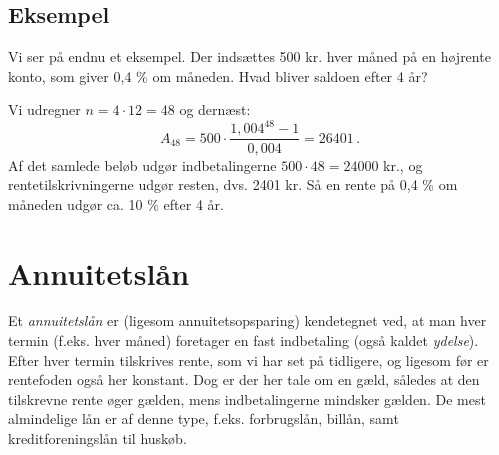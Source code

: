 \documentclass[12pt,oneside,a4paper]{article}
\begin{document}
\begin{tcolorbox}
\subsection*{Eksempel}
Vi ser på endnu et eksempel. Der indsættes 500 kr. hver måned på en højrente konto, som giver
0,4 $\%$ om måneden. Hvad bliver saldoen efter 4 år?

Vi udregner $n=4\cdot12 = 48$ og dernæst:
\[
A_{48} = 500\cdot\frac{1,004^{48}-1}{0,004} = 26401 \,.
\]
Af det samlede beløb udgør indbetalingerne $500\cdot 48 = 24000$ kr., og rentetilskrivningerne
udgør resten, dvs. 2401 kr. Så en rente på 0,4 $\%$ om måneden udgør ca. 10 $\%$ efter 4 år.

\end{tcolorbox}

\section{Annuitetslån}
Et \emph{annuitetslån} er (ligesom annuitetsopsparing) kendetegnet ved, at man
hver termin (f.eks. hver måned) foretager en fast indbetaling (også kaldet
\emph{ydelse}). Efter hver termin tilskrives rente, som vi har set på
tidligere, og ligesom før er rentefoden også her konstant. Dog er der her tale
om en gæld, således at den tilskrevne rente øger gælden, mens indbetalingerne
mindsker gælden.  De mest almindelige lån er af denne type, f.eks. forbrugslån,
billån, samt kreditforeningslån til huskøb.
\end{document}
